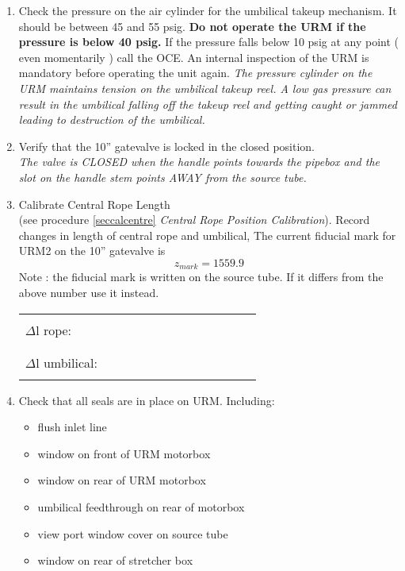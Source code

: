 \begin{enumerate}
\item\checkbox Check the pressure on the air cylinder for the umbilical
takeup mechanism. It should be between 45 and 55 psig.
   {\bf Do not operate the URM if the pressure is below 40 psig. }
 If the pressure falls below 10 psig at any point ( even momentarily ) call the OCE.
An internal inspection of the URM is mandatory before operating the unit again.
   \small
   {\em
     The pressure cylinder on the URM maintains tension on the umbilical
     takeup reel.  A low gas pressure can result in the umbilical falling
     off the takeup reel and getting caught or jammed leading to destruction
     of the umbilical.
   }
   \normalsize


\item\checkbox Verify that the 10'' gatevalve  is locked in the  closed position.\\
   \small
   {\em
     The valve is CLOSED when the handle points towards the pipebox and the slot
      on the handle stem points AWAY from the source tube.
   }
   \normalsize

\item \checkbox Calibrate Central Rope Length\\
      (see procedure  \ref{seccalcentre}
       {\em Central Rope Position Calibration}).
      Record changes in length of central rope and umbilical,
      The current fiducial mark for URM2  on the 10'' gatevalve
      is
      \[
               z_{mark} = 1559.9
      \]
       Note : the fiducial mark is written on the source tube. If it
       differs from the above number use it instead.

     \begin{center}
     \begin{tabular}{|l|}
     \hline
      \\
     $\Delta$l rope:~~~~~~~~~~~~~~~~~~~~~~~~\\
      \\
     \hline
      \\
     $\Delta$l umbilical:~~~~~~~~~~~~~~~~~~~~~~~~\\
      \\
     \hline
     \end{tabular}
     \end{center}


\item\checkbox Check that all seals are in place on URM.  Including:
   \begin{itemize}
      \item\checkbox flush inlet line
      \item\checkbox window on front of URM  motorbox
      \item\checkbox window on rear of URM motorbox
      \item\checkbox umbilical feedthrough on rear of motorbox
      \item\checkbox view port window cover on source tube
      \item\checkbox window on rear of stretcher box
   \end{itemize}



\end{enumerate}
